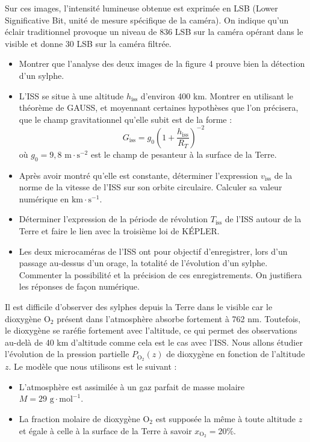 Sur ces images, l'intensité lumineuse obtenue est exprimée en LSB (Lower Significative Bit, unité de mesure spécifique de la caméra). On indique qu'un éclair traditionnel provoque un niveau de 836 LSB sur la caméra opérant dans le visible et donne 30 LSB sur la caméra filtrée.


\begin{itemize}
    \item[3.] Montrer que l'analyse des deux images de la figure 4 prouve bien la détection d'un sylphe.
    \item[4.] L'ISS se situe à une altitude $h_{\text{iss}}$ d'environ 400 km. Montrer en utilisant le théorème de GAUSS, et moyennant certaines hypothèses que l'on précisera, que le champ gravitationnel qu'elle subit est de la forme :
    \begin{equation*}
        G_{\text{iss}} = g_0 \left( 1 + \frac{h_{\text{iss}}}{R_T} \right)^{-2}
    \end{equation*}
    où $g_0 = 9,8 \text{ m} \cdot \text{s}^{-2}$ est le champ de pesanteur à la surface de la Terre.
    \item[5.] Après avoir montré qu'elle est constante, déterminer l'expression $v_{\text{iss}}$ de la norme de la vitesse de l'ISS sur son orbite circulaire. Calculer sa valeur numérique en $\text{km} \cdot \text{s}^{-1}$.
    \item[6.] Déterminer l'expression de la période de révolution $T_{\text{iss}}$ de l'ISS autour de la Terre et faire le lien avec la troisième loi de KÉPLER.
    \item[7.] Les deux microcaméras de l'ISS ont pour objectif d'enregistrer, lors d'un passage au-dessus d'un orage, la totalité de l'évolution d'un sylphe. Commenter la possibilité et la précision de ces enregistrements. On justifiera les réponses de façon numérique.
\end{itemize}

Il est difficile d'observer des sylphes depuis la Terre dans le visible car le dioxygène $\text{O}_2$ présent dans l'atmosphère absorbe fortement à 762 nm. Toutefois, le dioxygène se raréfie fortement avec l'altitude, ce qui permet des observations au-delà de 40 km d'altitude comme cela est le cas avec l'ISS. Nous allons étudier l'évolution de la pression partielle $P_{\text{O}_2}(z)$ de dioxygène en fonction de l'altitude $z$. Le modèle que nous utilisons est le suivant :

\begin{itemize}
    \item L'atmosphère est assimilée à un gaz parfait de masse molaire $M = 29 \text{ g} \cdot \text{mol}^{-1}$.
    \item La fraction molaire de dioxygène $\text{O}_2$ est supposée la même à toute altitude $z$ et égale à celle à la surface de la Terre à savoir $x_{\text{O}_2} = 20\%$.
\end{itemize}
